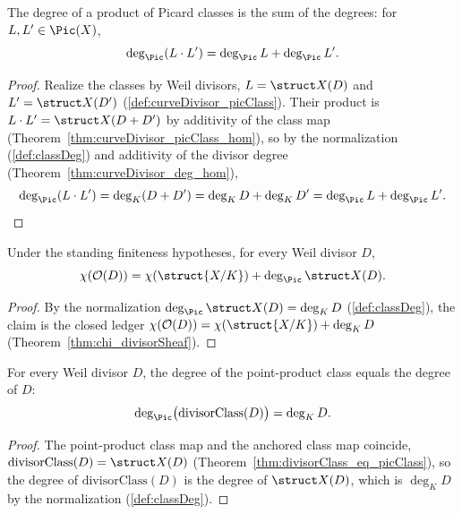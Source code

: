 \begin{theorem}
  \label{thm:classDeg_mul}
  \leanok
  The degree of a product of Picard classes is the sum of the degrees: for \(L, L' \in \Pic(X)\),
  \[
    \deg_{\Pic}(L \cdot L') = \deg_{\Pic} L + \deg_{\Pic} L' .
  \]
\end{theorem}
\begin{proof}
  \leanok
  Realize the classes by Weil divisors, \(L = \struct X(D)\) and \(L' = \struct X(D')\)
  (\ref{def:curveDivisor_picClass}). Their product is \(L \cdot L' = \struct X(D + D')\) by
  additivity of the class map (Theorem~\ref{thm:curveDivisor_picClass_hom}), so by the
  normalization (\ref{def:classDeg}) and additivity of the divisor degree
  (Theorem~\ref{thm:curveDivisor_deg_hom}),
  \[
    \deg_{\Pic}(L \cdot L') = \deg_K(D + D') = \deg_K D + \deg_K D' = \deg_{\Pic} L + \deg_{\Pic}
    L'.
  \]
\end{proof}

\begin{theorem}
  \label{thm:chi_divisorSheaf_classDeg}
  \leanok
  Under the standing finiteness hypotheses, for every Weil divisor \(D\),
  \[
    \chi(\mathcal O(D)) = \chi(\struct{X/K}) + \deg_{\Pic}\struct X(D) .
  \]
\end{theorem}
\begin{proof}
  \leanok
  By the normalization \(\deg_{\Pic}\struct X(D) = \deg_K D\) (\ref{def:classDeg}), the claim is the
  closed ledger \(\chi(\mathcal O(D)) = \chi(\struct{X/K}) + \deg_K D\)
  (Theorem~\ref{thm:chi_divisorSheaf}).
\end{proof}

\begin{theorem}
  \label{thm:classDeg_divisorClass}
  \leanok
  For every Weil divisor \(D\), the degree of the point-product class equals the degree of \(D\):
  \[
    \deg_{\Pic}\bigl(\mathrm{divisorClass}(D)\bigr) = \deg_K D .
  \]
\end{theorem}
\begin{proof}
  \leanok
  The point-product class map and the anchored class map coincide,
  \(\mathrm{divisorClass}(D) = \struct X(D)\) (Theorem~\ref{thm:divisorClass_eq_picClass}), so the
  degree of \(\mathrm{divisorClass}(D)\) is the degree of \(\struct X(D)\), which is \(\deg_K D\) by
  the normalization (\ref{def:classDeg}).
\end{proof}

